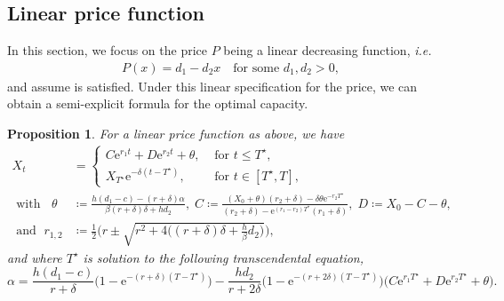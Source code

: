 \documentclass[12pt]{article}
\newtheorem{proposition}{Proposition}[section]
\def\erm{\mathrm{e}}
\begin{document}
\subsection{Linear price function}\label{limhomogeneous}
In this section, we focus on the price $P$ being a linear decreasing function, \textit{i.e.}
\begin{align*}
    P(x)=d_1-d_2x \quad\mbox{for some } d_1,d_2>0,
\end{align*}
and assume  is satisfied. 
Under this linear specification for the price, we can obtain a semi-explicit formula for the optimal capacity.
\begin{proposition}\label{Proposition}
    For a linear price function as above, we have
\begin{align}\label{eq:linear_sol}
X_t &= 
\begin{cases}
    C \erm^{r_{1} t}+D \erm^{r_{2} t}+\theta, &\mbox{ for }t\leq {T^\star },\\
    X_{T^\star }  \erm^{-\delta(t-{T^\star })}, &\mbox{ for }t\in[{T^\star },T],
\end{cases} \\[1em]
\text{ with } \; \; \theta &\coloneq \frac{{h}(d_1-c)-(r+\delta){\alpha }{}}{\beta(r+\delta)\delta+{h}d_2}, \; 
C \coloneq \frac{(X_0+\theta)(r_2+\delta) -\delta\theta  \erm^{-r_2 T^\star }}
{(r_2+\delta) -  \erm^{(r_1-r_2) T^\star }(r_1+\delta)}, \;
D \coloneq X_0-C-\theta, \nonumber \\
\text{ and } \; r_{1,2} &\coloneq \frac12\bigg(r\pm \sqrt{r^2+4\bigg((r+\delta)\delta+\frac{h}{\beta} d_2\bigg)}\bigg), \nonumber
\end{align}
and where $T^\star$ is solution to the following transcendental equation,
\begin{equation}\label{Tstareqn}
\alpha = \frac{h(d_1-c)}{r+\delta} \big( 1- \erm^{-(r+\delta)(T-{T^\star }
)} \big) -\frac{hd_2}{r+2\delta} \big( 1- \erm^{-(r+2\delta)(T-{T^\star }
)} \big) \big(C \erm^{r_1{T^\star }
}+D \erm^{r_2{T^\star }
}+\theta \big).
\end{equation}
\end{proposition}
\end{document}
